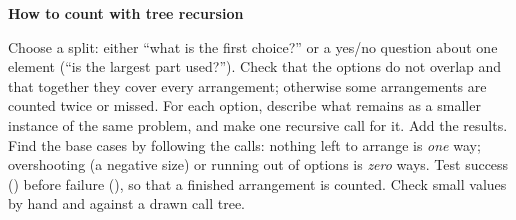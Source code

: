 \documentclass[10pt]{scrartcl}
\newenvironment{howto}[1]{\begin{mdframed}[style=howtostyle]{\color{NavyBlue}\textbf{#1}}\par\vspace{2pt}}{\end{mdframed}}
\begin{document}
\begin{howto}{How to count with tree recursion}
\begin{steps}
  \ii Choose a split: either ``what is the first choice?'' or a yes/no question about one element (``is the largest part used?'').
  \ii Check that the options do not overlap and that together they cover every arrangement; otherwise some arrangements are counted twice or missed.
  \ii For each option, describe what remains as a smaller instance of the same problem, and make one recursive call for it. Add the results.
  \ii Find the base cases by following the calls: nothing left to arrange is \emph{one} way; overshooting (a negative size) or running out of options is \emph{zero} ways.
  \ii Test success () before failure (), so that a finished arrangement is counted.
  \ii Check small values by hand and against a drawn call tree.
\end{steps}
\end{howto}
\end{document}
